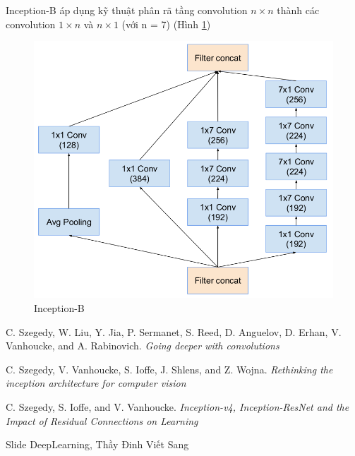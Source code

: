 \documentclass[a4paper,12pt]{report}
\begin{document}
\par Inception-B áp dụng kỹ thuật phân rã tầng convolution $n \times n$ thành các convolution $1 \times n$ và $n \times 1$ (với n = 7) (Hình \ref{fig_inceptionB})
\begin{figure}[H]
\centering 
\includegraphics[scale=0.4]{inceptionB.png}
\caption{Inception-B}
\label{fig_inceptionB}
\end{figure}


\begin{thebibliography}{9}
 C. Szegedy, W. Liu, Y. Jia, P. Sermanet, S. Reed, D. Anguelov, D. Erhan, V. Vanhoucke, and A. Rabinovich. \textit{Going deeper with convolutions}

 C. Szegedy, V. Vanhoucke, S. Ioffe, J. Shlens, and Z. Wojna. \textit{Rethinking the inception architecture for computer vision}

 C. Szegedy, S. Ioffe, and V. Vanhoucke. \textit{Inception-v4, Inception-ResNet and the Impact of Residual Connections on Learning}

 Slide DeepLearning, Thầy Đinh Viết Sang 

\end{thebibliography}
\end{document}
